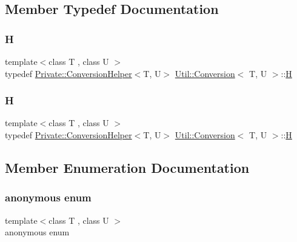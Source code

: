 \subsection{Member Typedef Documentation}
\mbox{\label{structUtil_1_1Conversion_a2f11e8da88ca0599a47c7d9fcc3ff2f2}} 
\subsubsection{\texorpdfstring{H}{H}\hspace{0.1cm}{\footnotesize\ttfamily [1/2]}}
{\footnotesize\ttfamily template$<$class T , class U $>$ \\
typedef \mbox{\hyperlink{structUtil_1_1Private_1_1ConversionHelper}{Private\+::\+Conversion\+Helper}}$<$T, U$>$ \mbox{\hyperlink{structUtil_1_1Conversion}{Util\+::\+Conversion}}$<$ T, U $>$\+::\mbox{\hyperlink{structUtil_1_1Conversion_a2f11e8da88ca0599a47c7d9fcc3ff2f2}{H}}}

\mbox{\label{structUtil_1_1Conversion_a2f11e8da88ca0599a47c7d9fcc3ff2f2}} 
\subsubsection{\texorpdfstring{H}{H}\hspace{0.1cm}{\footnotesize\ttfamily [2/2]}}
{\footnotesize\ttfamily template$<$class T , class U $>$ \\
typedef \mbox{\hyperlink{structUtil_1_1Private_1_1ConversionHelper}{Private\+::\+Conversion\+Helper}}$<$T, U$>$ \mbox{\hyperlink{structUtil_1_1Conversion}{Util\+::\+Conversion}}$<$ T, U $>$\+::\mbox{\hyperlink{structUtil_1_1Conversion_a2f11e8da88ca0599a47c7d9fcc3ff2f2}{H}}}



\subsection{Member Enumeration Documentation}
\mbox{\label{structUtil_1_1Conversion_a0afeebd8eb1397aae8486da9e36def56}} 
\subsubsection{\texorpdfstring{anonymous enum}{anonymous enum}}
{\footnotesize\ttfamily template$<$class T , class U $>$ \\
anonymous enum}

